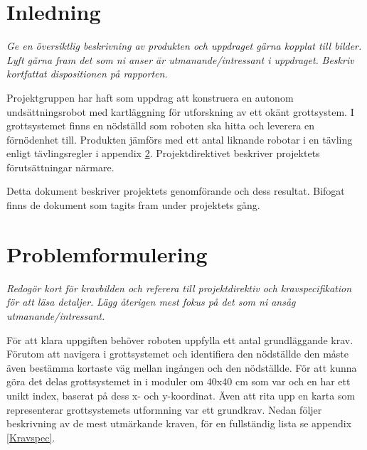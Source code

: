 \documentclass[11pt]{article}
\begin{document}
\begin{flushleft}
\section{Inledning}
\textit{Ge en översiktlig beskrivning av produkten och uppdraget gärna kopplat till bilder.}
\textit{Lyft gärna fram det som ni anser är utmanande/intressant i uppdraget.}
\textit{Beskriv kortfattat dispositionen på rapporten.}

Projektgruppen har haft som uppdrag att konstruera en autonom undsättningsrobot med kartläggning för utforskning av ett okänt grottsystem. I grottsystemet finns en nödställd som roboten ska hitta och leverera en förnödenhet till. Produkten jämförs med ett antal liknande robotar i en tävling enligt tävlingsregler i appendix \ref{}. Projektdirektivet beskriver projektets förutsättningar närmare. 

Detta dokument beskriver projektets genomförande och dess resultat. Bifogat finns de dokument som tagits fram under projektets gång.

\pagebreak

\section{Problemformulering}
\textit{Redogör kort för kravbilden och referera till projektdirektiv och kravspecifikation för att läsa detaljer.}
\textit{Lägg återigen mest fokus på det som ni ansåg utmanande/intressant.}

För att klara uppgiften behöver roboten uppfylla ett antal grundläggande krav. Förutom att navigera i grottsystemet och identifiera den nödställde den måste även bestämma kortaste väg mellan ingången och den nödställde. För att kunna göra det delas grottsystemet in i moduler om 40x40 cm som var och en har ett unikt index, baserat på dess x- och y-koordinat. Även att rita upp en karta som representerar grottsystemets utformning var ett grundkrav. Nedan följer beskrivning av de mest utmärkande kraven, för en fullständig lista se appendix \ref{Kravspec}.



\end{flushleft}
\end{document}
